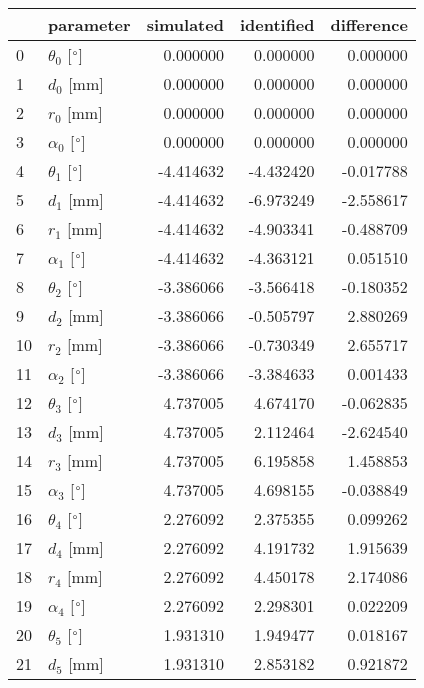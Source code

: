\documentclass{standalone}%
\begin{document}
%
\normalsize%
\begin{tabular}{llrrr}
\toprule
{} &                 parameter & simulated & identified & difference \\
\midrule
0  &  $\theta_{0}$ [$\degree$] &  0.000000 &   0.000000 &   0.000000 \\
1  &              $d_{0}$ [mm] &  0.000000 &   0.000000 &   0.000000 \\
2  &              $r_{0}$ [mm] &  0.000000 &   0.000000 &   0.000000 \\
3  &  $\alpha_{0}$ [$\degree$] &  0.000000 &   0.000000 &   0.000000 \\
4  &  $\theta_{1}$ [$\degree$] & -4.414632 &  -4.432420 &  -0.017788 \\
5  &              $d_{1}$ [mm] & -4.414632 &  -6.973249 &  -2.558617 \\
6  &              $r_{1}$ [mm] & -4.414632 &  -4.903341 &  -0.488709 \\
7  &  $\alpha_{1}$ [$\degree$] & -4.414632 &  -4.363121 &   0.051510 \\
8  &  $\theta_{2}$ [$\degree$] & -3.386066 &  -3.566418 &  -0.180352 \\
9  &              $d_{2}$ [mm] & -3.386066 &  -0.505797 &   2.880269 \\
10 &              $r_{2}$ [mm] & -3.386066 &  -0.730349 &   2.655717 \\
11 &  $\alpha_{2}$ [$\degree$] & -3.386066 &  -3.384633 &   0.001433 \\
12 &  $\theta_{3}$ [$\degree$] &  4.737005 &   4.674170 &  -0.062835 \\
13 &              $d_{3}$ [mm] &  4.737005 &   2.112464 &  -2.624540 \\
14 &              $r_{3}$ [mm] &  4.737005 &   6.195858 &   1.458853 \\
15 &  $\alpha_{3}$ [$\degree$] &  4.737005 &   4.698155 &  -0.038849 \\
16 &  $\theta_{4}$ [$\degree$] &  2.276092 &   2.375355 &   0.099262 \\
17 &              $d_{4}$ [mm] &  2.276092 &   4.191732 &   1.915639 \\
18 &              $r_{4}$ [mm] &  2.276092 &   4.450178 &   2.174086 \\
19 &  $\alpha_{4}$ [$\degree$] &  2.276092 &   2.298301 &   0.022209 \\
20 &  $\theta_{5}$ [$\degree$] &  1.931310 &   1.949477 &   0.018167 \\
21 &              $d_{5}$ [mm] &  1.931310 &   2.853182 &   0.921872 \\

\end{tabular}
\end{document}
